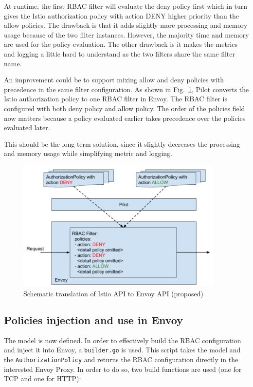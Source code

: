 At runtime, the first RBAC filter will evaluate the deny policy first which in turn gives the Istio authorization policy with action DENY higher priority than the allow policies.
The drawback is that it adds slightly more processing and memory usage because of the two filter instances. However, the majority time and memory are used for the policy evaluation.
The other drawback is it makes the metrics and logging a little hard to understand as the two filters share the same filter name.

An improvement could be to support mixing allow and deny policies with precedence in the same filter configuration. As shown in Fig.~\ref{fig:rbac-filter2}, Pilot converts the Istio authorization policy to one RBAC filter in Envoy. The RBAC filter is configured with both deny policy and allow policy. The order of the policies field now matters because a policy evaluated earlier takes precedence over the policies evaluated later.

This should be the long term solution, since it slightly decreases the processing and memory usage while simplifying metric and logging.


\begin{figure}[ht]
    \centering
    \includegraphics[width=0.92\textwidth]{chapters/images/chp3/rbac-filter2.png}
    \caption{Schematic translation of Istio API to Envoy API (proposed)}
    \label{fig:rbac-filter2}
\end{figure}

\subsection{Policies injection and use in Envoy}
The model is now defined. In order to effectively build the RBAC configuration and inject it into Envoy, a \texttt{builder.go} is used. This script takes the model and the \texttt{AuthorizationPolicy} and returns the RBAC configuration directly in the interested Envoy Proxy. In order to do so, two build functions are used (one for TCP and one for HTTP):


